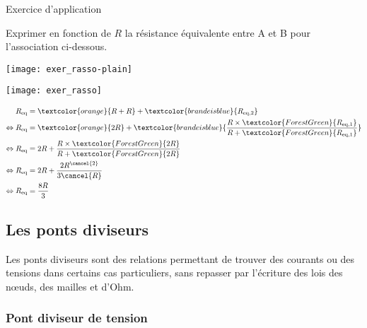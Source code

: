 \documentclass[../main/main.tex]{subfiles}
\begin{document}
\begin{NCexem}[sidebyside]{Exercice d'application}

    Exprimer en fonction de $R$ la résistance équivalente entre A et B pour
    l'association ci-dessous.
    \begin{center}
        \texttt{[image: exer\_rasso-plain]}
    \end{center}
    \tcblower
    \begin{center}
        \texttt{[image: exer\_rasso]}
    \end{center}
    \begin{align*}
        R_{\rm eq}                 & = \textcolor{orange}{R + R} +
            \textcolor{brandeisblue}{R_{\rm eq,2}} \\
        \Leftrightarrow R_{\rm eq} & = \textcolor{orange}{2R} +
            \textcolor{brandeisblue}{\frac{
                    R\times \textcolor{ForestGreen}{R_{\rm eq,1}}
            }{R + \textcolor{ForestGreen}{R_{\rm eq,1}}}}\\
        \Leftrightarrow R_{\rm eq} & = 2R + \frac{
            R\times\textcolor{ForestGreen}{2R}}{
            R+\textcolor{ForestGreen}{2R}} \\
        \Leftrightarrow R_{\rm eq} & = 2R + \frac{2R^{\cancel{2}}}{3\cancel{R}}\\
        \Leftrightarrow R_{\rm eq} & = \frac{8R}{3}
    \end{align*}
\end{NCexem}

\subsection{Les ponts diviseurs}

Les ponts diviseurs sont des relations permettant de trouver des courants ou des
tensions dans certains cas particuliers, sans repasser par l'écriture des lois
des nœuds, des mailles et d'Ohm.

\subsubsection{Pont diviseur de tension}
\end{document}
